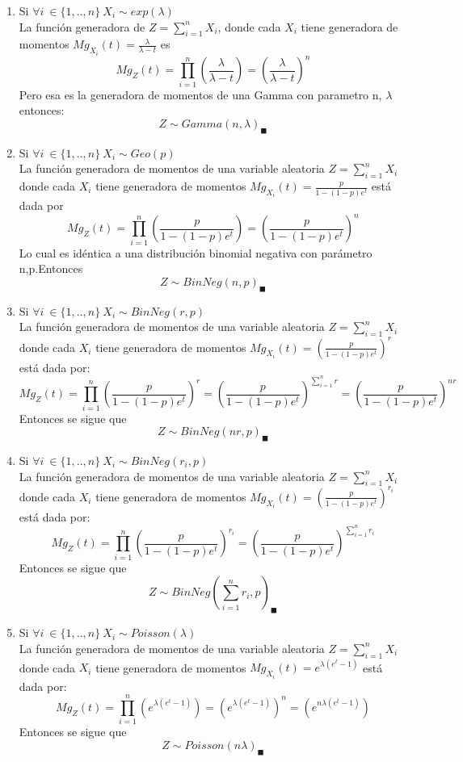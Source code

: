 \documentclass[11pt,a4paper]{report}
\begin{document}
\begin{enumerate}
{\begin{enumerate}
                \item{Si $\forall i \ \in \lbrace 1,..,n \rbrace \ X_{i} \sim exp(\lambda)$ }\\
                La función generadora de $Z=\sum_{i=1}^{n}X_{i}$, donde cada $X_{i}$ tiene generadora de momentos $Mg_{X_{i}}(t)=\frac{\lambda}{\lambda-t}$ es 
                $$Mg_{Z}(t)=\prod_{i=1}^{n}(\frac{\lambda}{\lambda-t})=(\frac{\lambda}{\lambda-t})^{n}$$
                Pero esa es la generadora de momentos de una Gamma con parametro n, $\lambda$ entonces:
                $$Z\sim Gamma(n,\lambda)_{\blacksquare}$$
                \item{Si $\forall i \ \in \lbrace 1,..,n \rbrace \ X_{i} \sim Geo(p)$ }\\
                La función generadora de momentos de una variable aleatoria $Z=\sum_{i=1}^{n}X_{i}$ donde cada $X_{i}$ tiene generadora de momentos $Mg_{X_{i}}(t)=\frac{p}{1-(1-p)e^t}$ está dada por
                $$Mg_{Z}(t)=\prod_{i=1}^{n}(\frac{p}{1-(1-p)e^t})=(\frac{p}{1-(1-p)e^t})^n$$ Lo cual es idéntica a una distribución binomial negativa con parámetro n,p.Entonces 
                $$Z\sim BinNeg(n,p)_{\blacksquare}$$
                \item{Si $\forall i \ \in \lbrace 1,..,n \rbrace \ X_{i} \sim BinNeg(r,p)$ }\\
                La función generadora de momentos de una variable aleatoria $Z=\sum_{i=1}^{n}X_{i}$ donde cada $X_{i}$ tiene generadora de momentos $Mg_{X_{i}}(t)=(\frac{p}{1-(1-p)e^t})^r$ está dada por:
                $$Mg_{Z}(t)=\prod_{i=1}^{n}(\frac{p}{1-(1-p)e^t})^r=(\frac{p}{1-(1-p)e^t})^{\sum_{i=1}^{n}r}=(\frac{p}{1-(1-p)e^t})^{nr}$$
                Entonces se sigue que 
                $$Z \sim BinNeg(nr,p)_{\blacksquare}$$
                \item{Si $\forall i \ \in \lbrace 1,..,n \rbrace \ X_{i} \sim BinNeg(r_{i},p)$ }\\
                La función generadora de momentos de una variable aleatoria $Z=\sum_{i=1}^{n}X_{i}$ donde cada $X_{i}$ tiene generadora de momentos $Mg_{X_{i}}(t)=(\frac{p}{1-(1-p)e^t})^{r_{i}}$ está dada por:
                $$Mg_{Z}(t)=\prod_{i=1}^{n}(\frac{p}{1-(1-p)e^t})^{r_{i}}=(\frac{p}{1-(1-p)e^t})^{\sum_{i=1}^{n}r_{i}}$$ Entonces se sigue que 
                $$Z\sim BinNeg(\sum_{i=1}^{n}r_{i},p)_{\blacksquare}$$
                \item{Si $\forall i \ \in \lbrace 1,..,n \rbrace \ X_{i} \sim Poisson(\lambda)$ }\\
                La función generadora de momentos de una variable aleatoria $Z=\sum_{i=1}^{n}X_{i}$ donde cada $X_{i}$ tiene generadora de momentos $Mg_{X_{i}}(t)=e^{\lambda(e^t-1)}$ está dada por:
                $$Mg_{Z}(t)=\prod_{i=1}^{n}(e^{\lambda(e^t-1)})=(e^{\lambda(e^t-1)})^n=(e^{n\lambda (e^t-1)})$$
                Entonces se sigue que 
                $$Z\sim Poisson(n\lambda)_{\blacksquare}$$
                

\end{enumerate}}
\end{enumerate}
\end{document}

